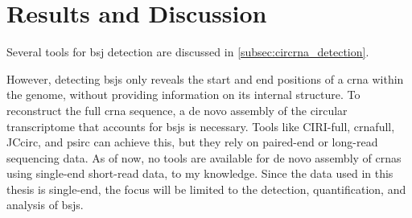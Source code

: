 \chapter{Results and Discussion}

Several tools for \gls{bsj} detection are discussed in
\cref{subsec:circrna_detection}.

However, detecting \gls{bsj}s only reveals the start and end positions of a
\gls{crna} within the genome, without providing information on its internal
structure.
To reconstruct the full \gls{crna} sequence, a de novo assembly of the circular
transcriptome that accounts for \gls{bsj}s is necessary.
Tools like CIRI-full, \gls{crna}full, JCcirc, and psirc can achieve this, but
they rely on paired-end or long-read sequencing data.
As of now, no tools are available for de novo assembly of \gls{crna}s using
single-end short-read data, to my knowledge.
Since the data used in this thesis is single-end, the focus will be limited to
the detection, quantification, and analysis of \gls{bsj}s.





